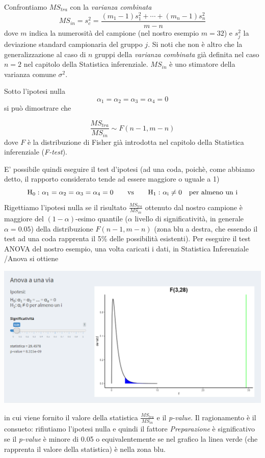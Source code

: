 \documentclass[
  11pt,
]{book}
\begin{document}
Confrontiamo \(MS_{tra}\) con la \emph{varianza combinata}
\[
MS_{in}=s_c^2=\frac{(m_1-1)s_1^2+\cdots+(m_n-1)s_n^2}{m-n}
\]
dove \(m\) indica la numerosità del campione (nel nostro esempio \(m=32\)) e \(s_j^2\) la deviazione standard campionaria del gruppo \(j\).
Si noti che non è altro che la generalizzazione al caso di \(n\) gruppi della \emph{varianza combinata} già definita nel caso \(n=2\) nel capitolo della Statistica inferenziale. \(MS_{in}\) è uno stimatore della varianza comune \(\sigma^2\).

Sotto l'ipotesi nulla
\[
\alpha_1=\alpha_2=\alpha_3=\alpha_4=0
\]
si può dimostrare che

\[
\frac{MS_{tra}}{MS_{in}} \sim F(n-1,m-n)
\]
dove \(F\) è la distribuzione di Fisher già introdotta nel capitolo della Statistica inferenziale (\emph{F-test}).

E' possibile quindi eseguire il test d'ipotesi (ad una coda, poichè, come abbiamo detto, il rapporto considerato tende ad essere maggiore o uguale a 1)
\[
\rm{H_0:\ } \alpha_1=\alpha_2=\alpha_3=\alpha_4=0 \qquad \rm{vs} \qquad \rm{H_1:\ } \alpha_i\neq0 \quad \rm{per \ almeno\  un\ } i
\]
Rigettiamo l'ipotesi nulla se il risultato \(\frac{MS_{tra}}{MS_{in}}\) ottenuto dal nostro campione è maggiore del \((1-\alpha)\)-esimo quantile (\(\alpha\) livello di significatività, in generale \(\alpha=0.05\)) della distribuzione \(F(n-1,m-n)\) (zona blu a destra, che essendo il test ad una coda rapprenta il 5\% delle possibilità esistenti).
Per eseguire il test ANOVA del nostro esempio, una volta caricati i dati, in Statistica Inferenziale /Anova si ottiene

\begin{center}\includegraphics[width=0.5\linewidth]{Immagini/Anova/04_anova1} \end{center}

in cui viene fornito il valore della statistica \(\frac{MS_{tra}}{MS_{in}}\) e il \emph{p-value}. Il ragionamento è il consueto: rifiutiamo l'ipotesi nulla e quindi il fattore \emph{Preparazione} è significativo se il \emph{p-value} è minore di 0.05 o equivalentemente se nel grafico la linea verde (che rapprenta il valore della statistica) è nella zona blu.
\end{document}
